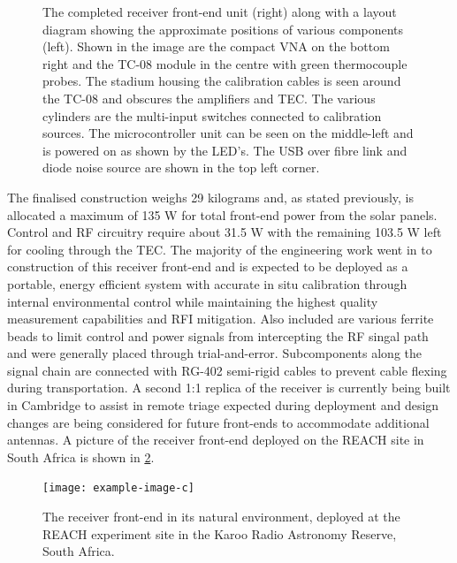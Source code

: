 \begin{figure}
\begin{subfigure}{.45\textwidth}
    \end{subfigure}
    \caption{The completed receiver front-end unit (right) along with a layout diagram showing the approximate positions of various components (left). Shown in the image are the compact VNA on the bottom right and the TC-08 module in the centre with green thermocouple probes. The stadium housing the calibration cables is seen around the TC-08 and obscures the amplifiers and TEC. The various cylinders are the multi-input switches connected to calibration sources. The microcontroller unit can be seen on the middle-left and is powered on as shown by the LED's. The USB over fibre link and diode noise source are shown in the top left corner.}
    \label{fig:frontend_complete}
\end{figure}
The finalised construction weighs 29 kilograms and, as stated previously, is allocated a maximum of 135 W for total front-end power from the solar panels. Control and RF circuitry require about 31.5 W with the remaining 103.5 W left for cooling through the TEC. The majority of the engineering work went in to construction of this receiver front-end and is expected to be deployed as a portable, energy efficient system with accurate in situ calibration through internal environmental control while maintaining the highest quality measurement capabilities and RFI mitigation. Also included are various ferrite beads to limit control and power signals from intercepting the RF singal path and were generally placed through trial-and-error. Subcomponents along the signal chain are connected with RG-402 semi-rigid cables to prevent cable flexing during transportation. A second 1:1 replica of the receiver is currently being built in Cambridge to assist in remote triage expected during deployment and design changes are being considered for future front-ends to accommodate additional antennas. A picture of the receiver front-end deployed on the REACH site in South Africa is shown in \cref{fig:frontend_deployed}.
\begin{figure}
    \centering
    \texttt{[image: example-image-c]}
    \caption{The receiver front-end in its natural environment, deployed at the REACH experiment site in the Karoo Radio Astronomy Reserve, South Africa.}
    \label{fig:frontend_deployed}
\end{figure}


